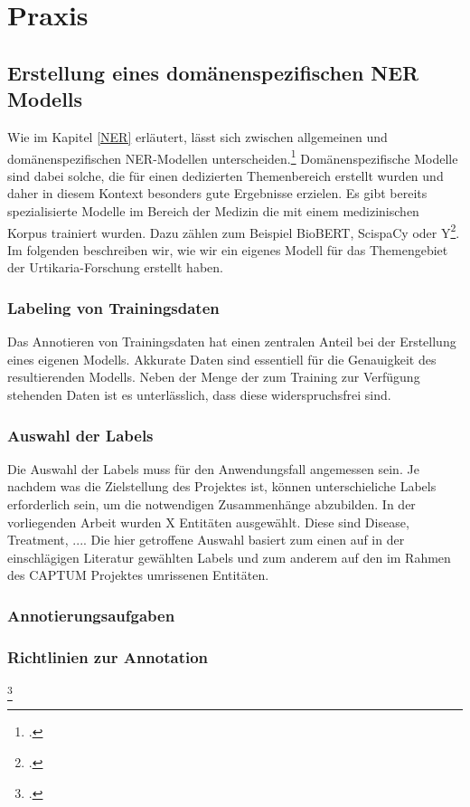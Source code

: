 \newpage
\section{Praxis} \label{latexDetails}
\subsection{Erstellung eines domänenspezifischen NER Modells}
Wie im Kapitel \ref{NER} erläutert, lässt sich zwischen allgemeinen und domänenspezifischen \ac{NER}-Modellen unterscheiden.\footcite[vgl.][S.47]{nouvel2016} Domänenspezifische Modelle sind dabei solche, die für einen dedizierten Themenbereich erstellt wurden und daher in diesem Kontext besonders gute Ergebnisse erzielen.
Es gibt bereits spezialisierte Modelle im Bereich der Medizin die mit einem medizinischen Korpus trainiert wurden. Dazu zählen zum Beispiel BioBERT, ScispaCy oder Y\footcite[S.12]{li2020}. Im folgenden beschreiben wir, wie wir ein eigenes Modell für das Themengebiet der Urtikaria-Forschung erstellt haben.
\subsubsection{Labeling von Trainingsdaten}
Das Annotieren von Trainingsdaten hat einen zentralen Anteil bei der Erstellung eines eigenen Modells. Akkurate Daten sind essentiell für die Genauigkeit des resultierenden Modells. Neben der Menge der zum Training zur Verfügung stehenden Daten ist es unterlässlich, dass diese widerspruchsfrei sind.

\subsubsection{Auswahl der Labels}
Die Auswahl der Labels muss für den Anwendungsfall angemessen sein. Je nachdem was die Zielstellung des Projektes ist, können unterschieliche Labels erforderlich sein, um die notwendigen Zusammenhänge abzubilden.
In der vorliegenden Arbeit wurden X Entitäten ausgewählt. Diese sind Disease, Treatment, .... Die hier getroffene Auswahl basiert zum einen auf in der einschlägigen Literatur gewählten Labels und zum anderem auf den im Rahmen des CAPTUM Projektes umrissenen Entitäten.

\subsubsection{Annotierungsaufgaben}

\subsubsection{Richtlinien zur Annotation}
\footcite[vgl.][]{neves2014}

